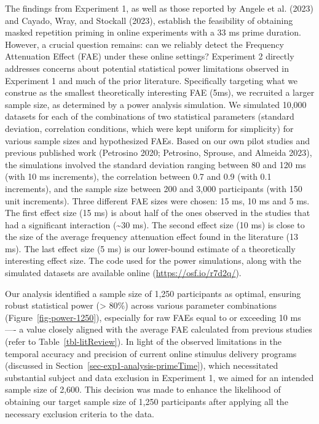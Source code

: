 \documentclass[
]{interact}
\begin{document}
The findings from Experiment 1, as well as those reported by Angele et
al. (2023) and Cayado, Wray, and Stockall (2023), establish the
feasibility of obtaining masked repetition priming in online experiments
with a 33 ms prime duration. However, a crucial question remains: can we
reliably detect the Frequency Attenuation Effect (FAE) under these
online settings? Experiment 2 directly addresses concerns about
potential statistical power limitations observed in Experiment 1 and
much of the prior literature. Specifically targeting what we construe as
the smallest theoretically interesting FAE (5ms), we recruited a larger
sample size, as determined by a power analysis simulation. We simulated
10,000 datasets for each of the combinations of two statistical
parameters (standard deviation, correlation conditions, which were kept
uniform for simplicity) for various sample sizes and hypothesized FAEs.
Based on our own pilot studies and previous published work (Petrosino
2020; Petrosino, Sprouse, and Almeida 2023), the simulations involved
the standard deviation ranging between 80 and 120 ms (with 10 ms
increments), the correlation between 0.7 and 0.9 (with 0.1 increments),
and the sample size between 200 and 3,000 participants (with 150 unit
increments). Three different FAE sizes were chosen: 15 ms, 10 ms and 5
ms. The first effect size (15 ms) is about half of the ones observed in
the studies that had a significant interaction (\textasciitilde30 ms).
The second effect size (10 ms) is close to the size of the average
frequency attenuation effect found in the literature (13 ms). The last
effect size (5 ms) is our lower-bound estimate of a theoretically
interesting effect size. The code used for the power simulations, along
with the simulated datasets are available online
(\url{https://osf.io/r7d2q/}).

Our analysis identified a sample size of 1,250 participants as optimal,
ensuring robust statistical power (\textgreater{} 80\%) across various
parameter combinations (Figure~\ref{fig-power-1250}), especially for raw
FAEs equal to or exceeding 10 ms ---- a value closely aligned with the
average FAE calculated from previous studies (refer to
Table~\ref{tbl-litReview}). In light of the observed limitations in the
temporal accuracy and precision of current online stimulus delivery
programs (discussed in Section~\ref{sec-exp1-analysis-primeTime}), which
necessitated substantial subject and data exclusion in Experiment 1, we
aimed for an intended sample size of 2,600. This decision was made to
enhance the likelihood of obtaining our target sample size of 1,250
participants after applying all the necessary exclusion criteria to the
data.
\end{document}

